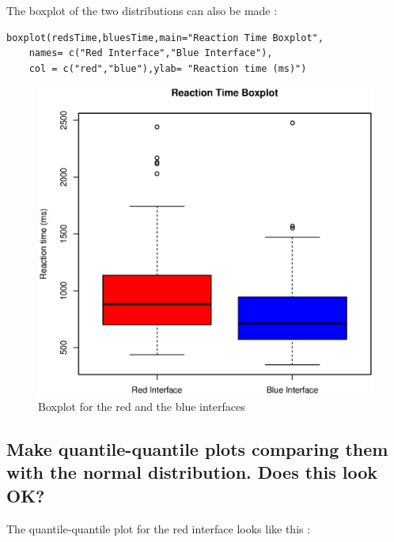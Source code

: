 \documentclass[12pt,a4paper]{scrartcl}
\begin{document}
\pagebreak
The boxplot of the two distributions can also be made : 

\begin{lstlisting}[frame=single]
boxplot(redsTime,bluesTime,main="Reaction Time Boxplot", 
    names= c("Red Interface","Blue Interface"),
    col = c("red","blue"),ylab= "Reaction time (ms)")
\end{lstlisting}
\begin{figure}[H]
\includegraphics[scale=0.7]{Boxplot.eps}
\centering
\caption{Boxplot for the red and the blue interfaces}
\end{figure}

\subsection{Make quantile-quantile plots comparing them with the normal distribution. Does this look OK?}
The quantile-quantile plot for the red interface looks like this :
\end{document}
